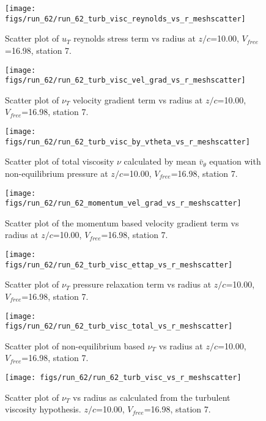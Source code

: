 \begin{figure}[H]
\centering
\texttt{[image: figs/run\_62/run\_62\_turb\_visc\_reynolds\_vs\_r\_meshscatter]}
\caption{Scatter plot of $
u_T$ reynolds stress term vs radius at $z/c$=10.00, $V_{free}$=16.98, station 7.}
\end{figure}


\begin{figure}[H]
\centering
\texttt{[image: figs/run\_62/run\_62\_turb\_visc\_vel\_grad\_vs\_r\_meshscatter]}
\caption{Scatter plot of $\nu_T$ velocity gradient term vs radius at $z/c$=10.00, $V_{free}$=16.98, station 7.}
\end{figure}


\begin{figure}[H]
\centering
\texttt{[image: figs/run\_62/run\_62\_turb\_visc\_by\_vtheta\_vs\_r\_meshscatter]}
\caption{Scatter plot of total viscosity $\nu$ calculated by mean $\bar{v}_{\theta}$ equation with non-equilibrium pressure at $z/c$=10.00, $V_{free}$=16.98, station 7.}
\end{figure}


\begin{figure}[H]
\centering
\texttt{[image: figs/run\_62/run\_62\_momentum\_vel\_grad\_vs\_r\_meshscatter]}
\caption{Scatter plot of the momentum based velocity gradient term vs radius at $z/c$=10.00, $V_{free}$=16.98, station 7.}
\end{figure}


\begin{figure}[H]
\centering
\texttt{[image: figs/run\_62/run\_62\_turb\_visc\_ettap\_vs\_r\_meshscatter]}
\caption{Scatter plot of $\nu_T$ pressure relaxation term vs radius at $z/c$=10.00, $V_{free}$=16.98, station 7.}
\end{figure}


\begin{figure}[H]
\centering
\texttt{[image: figs/run\_62/run\_62\_turb\_visc\_total\_vs\_r\_meshscatter]}
\caption{Scatter plot of non-equilibrium based $\nu_T$ vs radius at $z/c$=10.00, $V_{free}$=16.98, station 7.}
\end{figure}


\begin{figure}[H]
\centering
\texttt{[image: figs/run\_62/run\_62\_turb\_visc\_vs\_r\_meshscatter]}
\caption{Scatter plot of $\nu_T$ vs radius as calculated from the turbulent viscosity hypothesis. $z/c$=10.00, $V_{free}$=16.98, station 7.}
\end{figure}


